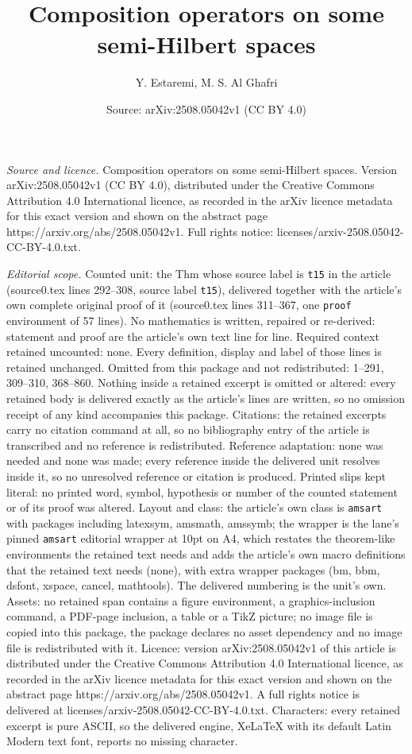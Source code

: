 \documentclass[10pt,a4paper]{amsart}
\title[Composition operators on some semi-Hilbert spaces]{Composition operators on some semi-Hilbert spaces}
\author{Y. Estaremi, M. S. Al Ghafri}
\date{Source: arXiv:2508.05042v1 (CC BY 4.0)}
\begin{document}
\maketitle

\noindent\emph{Source and licence.} Composition operators on some semi-Hilbert spaces. Version arXiv:2508.05042v1 (CC BY 4.0), distributed under the Creative Commons Attribution 4.0 International licence, as recorded in the arXiv licence metadata for this exact version and shown on the abstract page https://arxiv.org/abs/2508.05042v1. Full rights notice: licenses/arxiv-2508.05042-CC-BY-4.0.txt.\par\smallskip

\noindent\textit{Editorial scope.} Counted unit: the Thm whose source label is \texttt{t15} in the article (source0.tex lines 292--308, source label \texttt{t15}), delivered together with the article's own complete original proof of it (source0.tex lines 311--367, one \texttt{proof} environment of 57 lines). No mathematics is written, repaired or re-derived: statement and proof are the article's own text line for line. Required context retained uncounted: none. Every definition, display and label of those lines is retained unchanged. Omitted from this package and not redistributed: 1--291, 309--310, 368--860. Nothing inside a retained excerpt is omitted or altered: every retained body is delivered exactly as the article's lines are written, so no omission receipt of any kind accompanies this package. Citations: the retained excerpts carry no citation command at all, so no bibliography entry of the article is transcribed and no reference is redistributed. Reference adaptation: none was needed and none was made; every reference inside the delivered unit resolves inside it, so no unresolved reference or citation is produced. Printed slips kept literal: no printed word, symbol, hypothesis or number of the counted statement or of its proof was altered. Layout and class: the article's own class is \texttt{amsart} with packages including latexsym, amsmath, amssymb; the wrapper is the lane's pinned \texttt{amsart} editorial wrapper at 10pt on A4, which restates the theorem-like environments the retained text needs and adds the article's own macro definitions that the retained text needs (none), with extra wrapper packages (bm, bbm, dsfont, xspace, cancel, mathtools). The delivered numbering is the unit's own. Assets: no retained span contains a figure environment, a graphics-inclusion command, a PDF-page inclusion, a table or a TikZ picture; no image file is copied into this package, the package declares no asset dependency and no image file is redistributed with it. Licence: version arXiv:2508.05042v1 of this article is distributed under the Creative Commons Attribution 4.0 International licence, as recorded in the arXiv licence metadata for this exact version and shown on the abstract page https://arxiv.org/abs/2508.05042v1. A full rights notice is delivered at licenses/arxiv-2508.05042-CC-BY-4.0.txt. Characters: every retained excerpt is pure ASCII, so the delivered engine, XeLaTeX with its default Latin Modern text font, reports no missing character.
\end{document}
